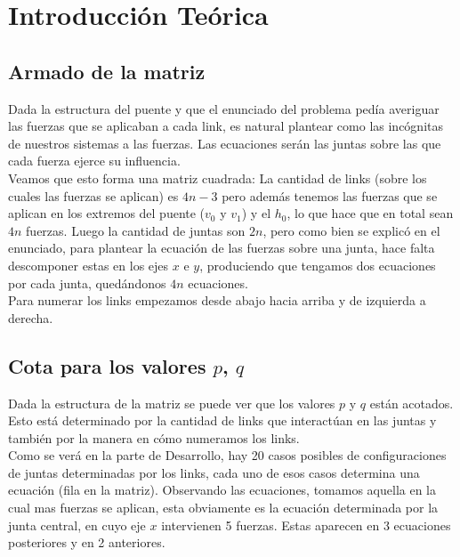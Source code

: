 \section{Introducción Teórica}

\subsection{Armado de la matriz}

Dada la estructura del puente y que el enunciado del problema pedía averiguar las fuerzas que se aplicaban a cada link, es natural plantear como las incógnitas de nuestros sistemas a las fuerzas. Las ecuaciones serán las juntas sobre las que cada fuerza ejerce su influencia.\\

Veamos que esto forma una matriz cuadrada: La cantidad de links (sobre los cuales las fuerzas se aplican) es $4n - 3$ pero además tenemos las fuerzas que se aplican en los extremos del puente ($v_0$ y $v_1$) y el $h_0$, lo que hace que en total sean $4n$ fuerzas. Luego la cantidad de juntas son $2n$, pero como bien se explicó en el enunciado, para plantear la ecuación de las fuerzas sobre una junta, hace falta descomponer estas en los ejes $x$ e $y$, produciendo que tengamos dos ecuaciones por cada junta, quedándonos $4n$ ecuaciones.\\

Para numerar los links empezamos desde abajo hacia arriba y de izquierda a derecha.

\subsection{Cota para los valores $p$, $q$}

Dada la estructura de la matriz se puede ver que los valores $p$ y $q$ están acotados. Esto está determinado por la cantidad de links que interactúan en las juntas y también por la manera en cómo numeramos los links.\\

Como se verá en la parte de Desarrollo, hay 20 casos posibles de configuraciones de juntas determinadas por los links, cada uno de esos casos determina una ecuación (fila en la matriz). Observando las ecuaciones, tomamos aquella en la cual mas fuerzas se aplican, esta obviamente es la ecuación determinada por la junta central, en cuyo eje $x$ intervienen 5 fuerzas. Estas aparecen en 3 ecuaciones posteriores y en 2 anteriores.\\

